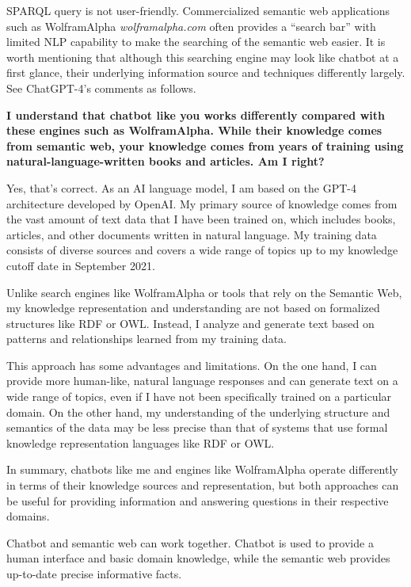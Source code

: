 SPARQL query is not user-friendly. Commercialized semantic web applications such as WolframAlpha \textit{wolframalpha.com} often provides a ``search bar'' with limited NLP capability to make the searching of the semantic web easier. It is worth mentioning that although this searching engine may look like chatbot at a first glance, their underlying information source and techniques differently largely. See ChatGPT-4's comments as follows.

\begin{mdframed}

\textbf{I understand that chatbot like you works differently compared with these engines such as WolframAlpha. While their knowledge comes from semantic web, your knowledge comes from years of training using natural-language-written books and articles. Am I right?}

Yes, that's correct. As an AI language model, I am based on the GPT-4 architecture developed by OpenAI. My primary source of knowledge comes from the vast amount of text data that I have been trained on, which includes books, articles, and other documents written in natural language. My training data consists of diverse sources and covers a wide range of topics up to my knowledge cutoff date in September 2021.

Unlike search engines like WolframAlpha or tools that rely on the Semantic Web, my knowledge representation and understanding are not based on formalized structures like RDF or OWL. Instead, I analyze and generate text based on patterns and relationships learned from my training data.

This approach has some advantages and limitations. On the one hand, I can provide more human-like, natural language responses and can generate text on a wide range of topics, even if I have not been specifically trained on a particular domain. On the other hand, my understanding of the underlying structure and semantics of the data may be less precise than that of systems that use formal knowledge representation languages like RDF or OWL.

In summary, chatbots like me and engines like WolframAlpha operate differently in terms of their knowledge sources and representation, but both approaches can be useful for providing information and answering questions in their respective domains.
\end{mdframed}

Chatbot and semantic web can work together. Chatbot is used to provide a human interface and basic domain knowledge, while the semantic web provides up-to-date precise informative facts.

